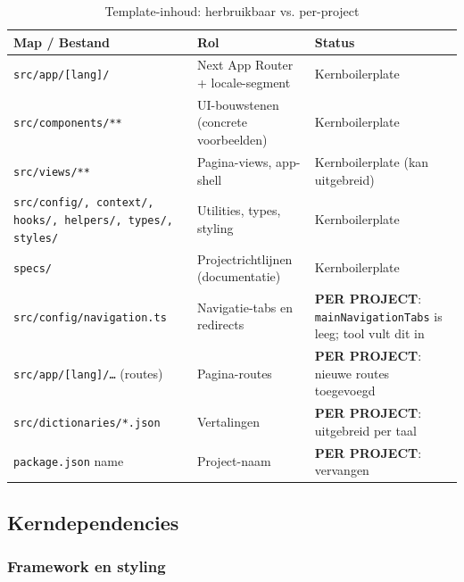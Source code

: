\begin{table}[htbp]
  \centering
  \caption{Template-inhoud: herbruikbaar vs. per-project}
  \label{tab:template-structure}
  \small
  \begin{tabularx}{\textwidth}{|l|l|l|}
    \hline
    \textbf{Map / Bestand} & \textbf{Rol} & \textbf{Status} \\
    \hline
    \texttt{src/app/[lang]/} &
    Next App Router + locale-segment &
    Kernboilerplate \\
    \hline
    \texttt{src/components/**} &
    UI-bouwstenen (concrete voorbeelden) &
    Kernboilerplate \\
    \hline
    \texttt{src/views/**} &
    Pagina-views, app-shell &
    Kernboilerplate (kan uitgebreid) \\
    \hline
    \texttt{src/config/, context/, hooks/, helpers/, types/, styles/} &
    Utilities, types, styling &
    Kernboilerplate \\
    \hline
    \texttt{specs/} &
    Projectrichtlijnen (documentatie) &
    Kernboilerplate \\
    \hline
    \texttt{src/config/navigation.ts} &
    Navigatie-tabs en redirects &
    \textbf{PER PROJECT}: \texttt{mainNavigationTabs} is leeg; tool vult dit in \\
    \hline
    \texttt{src/app/[lang]/…} (routes) &
    Pagina-routes &
    \textbf{PER PROJECT}: nieuwe routes toegevoegd \\
    \hline
    \texttt{src/dictionaries/*.json} &
    Vertalingen &
    \textbf{PER PROJECT}: uitgebreid per taal \\
    \hline
    \texttt{package.json} name &
    Project-naam &
    \textbf{PER PROJECT}: vervangen \\
    \hline
  \end{tabularx}
\end{table}

\subsection{Kerndependencies}

\subsubsection{Framework en styling}

